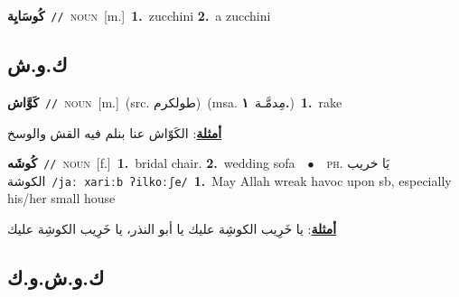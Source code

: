 \documentclass[10pt,a4paper,twoside]{article} %
\begin{document}
\begin{multicols}{2}
{\setlength\topsep{0pt}\textbf{\foreignlanguage{arabic}{كُوسَايِة}}\ {\color{gray}\texttt{//}\color{black}}\ \textsc{noun}\ [m.]\ \textbf{1.}~zucchini  \textbf{2.}~a zucchini\ } \vspace{2mm}

\vspace{-3mm}
\subsection*{\color{blue}\foreignlanguage{arabic}{ك.و.ش}\color{blue}{}} 

{\setlength\topsep{0pt}\textbf{\foreignlanguage{arabic}{كَوَّاش}}\ {\color{gray}\texttt{//}\color{black}}\ \textsc{noun}\ [m.]\ (src. \color{gray}\foreignlanguage{arabic}{طولكرم}\color{black})\ \color{gray}(msa. \foreignlanguage{arabic}{مِدمَّـة}~\foreignlanguage{arabic}{\textbf{١.}})\color{black}\ \textbf{1.}~rake\  \begin{flushright}\color{gray}\foreignlanguage{arabic}{\textbf{\underline{\foreignlanguage{arabic}{أمثلة}}}: الكَوّاش عنا بنلم فيه القش والوسخ}\end{flushright}\color{black}} \vspace{2mm}

{\setlength\topsep{0pt}\textbf{\foreignlanguage{arabic}{كُوشَه}}\ {\color{gray}\texttt{//}\color{black}}\ \textsc{noun}\ [f.]\ \textbf{1.}~bridal chair.  \textbf{2.}~wedding sofa\ \ $\bullet$\ \ \textsc{ph.} \color{gray} \foreignlanguage{arabic}{يَا خريب الكوشة}\color{black}\ {\color{gray}\texttt{/{\sffamily jaː xariːb ʔilkoːʃe}/}\color{black}}\ \textbf{1.}~May Allah wreak havoc upon sb, especially his/her small house\  \begin{flushright}\color{gray}\foreignlanguage{arabic}{\textbf{\underline{\foreignlanguage{arabic}{أمثلة}}}: يا خَرِيب الكوشِة عليك يا أبو النذر، يا خَرِيب الكوشِة عليك}\end{flushright}\color{black}} \vspace{2mm}

\vspace{-3mm}
\subsection*{\color{blue}\foreignlanguage{arabic}{ك.و.ش.و.ك}\color{blue}{ (ntws)}} 


\end{multicols}
\end{document}

